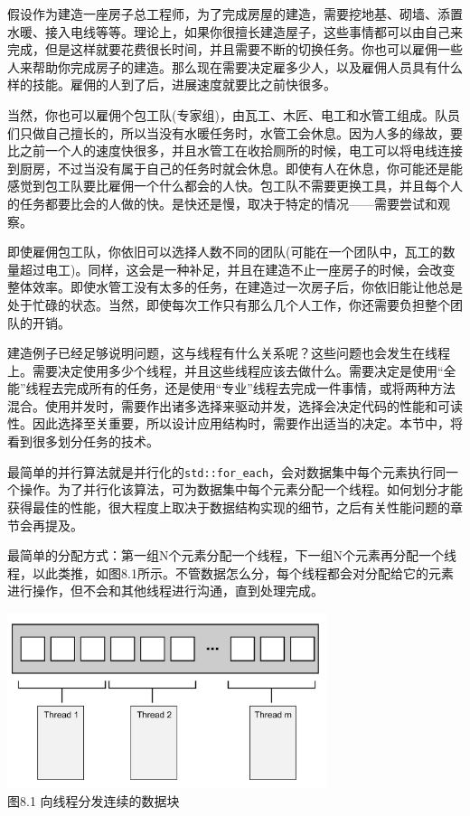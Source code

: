 
假设作为建造一座房子总工程师，为了完成房屋的建造，需要挖地基、砌墙、添置水暖、接入电线等等。理论上，如果你很擅长建造屋子，这些事情都可以由自己来完成，但是这样就要花费很长时间，并且需要不断的切换任务。你也可以雇佣一些人来帮助你完成房子的建造。那么现在需要决定雇多少人，以及雇佣人员具有什么样的技能。雇佣的人到了后，进展速度就要比之前快很多。

当然，你也可以雇佣个包工队(专家组)，由瓦工、木匠、电工和水管工组成。队员们只做自己擅长的，所以当没有水暖任务时，水管工会休息。因为人多的缘故，要比之前一个人的速度快很多，并且水管工在收拾厕所的时候，电工可以将电线连接到厨房，不过当没有属于自己的任务时就会休息。即使有人在休息，你可能还是能感觉到包工队要比雇佣一个什么都会的人快。包工队不需要更换工具，并且每个人的任务都要比会的人做的快。是快还是慢，取决于特定的情况——需要尝试和观察。

即使雇佣包工队，你依旧可以选择人数不同的团队(可能在一个团队中，瓦工的数量超过电工)。同样，这会是一种补足，并且在建造不止一座房子的时候，会改变整体效率。即使水管工没有太多的任务，在建造过一次房子后，你依旧能让他总是处于忙碌的状态。当然，即使每次工作只有那么几个人工作，你还需要负担整个团队的开销。

建造例子已经足够说明问题，这与线程有什么关系呢？这些问题也会发生在线程上。需要决定使用多少个线程，并且这些线程应该去做什么。需要决定是使用“全能”线程去完成所有的任务，还是使用“专业”线程去完成一件事情，或将两种方法混合。使用并发时，需要作出诸多选择来驱动并发，选择会决定代码的性能和可读性。因此选择至关重要，所以设计应用结构时，需要作出适当的决定。本节中，将看到很多划分任务的技术。


最简单的并行算法就是并行化的\texttt{std::for\_each}，会对数据集中每个元素执行同一个操作。为了并行化该算法，可为数据集中每个元素分配一个线程。如何划分才能获得最佳的性能，很大程度上取决于数据结构实现的细节，之后有关性能问题的章节会再提及。

最简单的分配方式：第一组N个元素分配一个线程，下一组N个元素再分配一个线程，以此类推，如图8.1所示。不管数据怎么分，每个线程都会对分配给它的元素进行操作，但不会和其他线程进行沟通，直到处理完成。

\begin{center}
  \includegraphics[width=0.7\textwidth]{content/chapter08/images/8-1.png}\\
  图8.1 向线程分发连续的数据块
\end{center}

